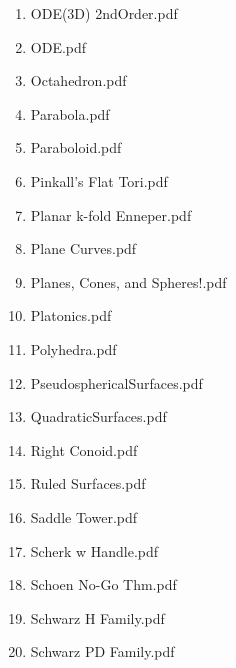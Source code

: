 \documentclass[11pt]{article}
\begin{document}
\begin{enumerate}
\begin{enumerate}
\item ODE(3D) 2ndOrder.pdf
\label{sec-1-1-1-1-29-20-93}

\item ODE.pdf
\label{sec-1-1-1-1-29-20-94}

\item Octahedron.pdf
\label{sec-1-1-1-1-29-20-95}

\item Parabola.pdf
\label{sec-1-1-1-1-29-20-96}

\item Paraboloid.pdf
\label{sec-1-1-1-1-29-20-97}

\item Pinkall's Flat Tori.pdf
\label{sec-1-1-1-1-29-20-98}

\item Planar k-fold Enneper.pdf
\label{sec-1-1-1-1-29-20-99}

\item Plane Curves.pdf
\label{sec-1-1-1-1-29-20-100}

\item Planes, Cones, and Spheres!.pdf
\label{sec-1-1-1-1-29-20-101}

\item Platonics.pdf
\label{sec-1-1-1-1-29-20-102}

\item Polyhedra.pdf
\label{sec-1-1-1-1-29-20-103}

\item PseudosphericalSurfaces.pdf
\label{sec-1-1-1-1-29-20-104}

\item QuadraticSurfaces.pdf
\label{sec-1-1-1-1-29-20-105}

\item Right Conoid.pdf
\label{sec-1-1-1-1-29-20-106}

\item Ruled Surfaces.pdf
\label{sec-1-1-1-1-29-20-107}

\item Saddle Tower.pdf
\label{sec-1-1-1-1-29-20-108}

\item Scherk w Handle.pdf
\label{sec-1-1-1-1-29-20-109}

\item Schoen No-Go Thm.pdf
\label{sec-1-1-1-1-29-20-110}

\item Schwarz H Family.pdf
\label{sec-1-1-1-1-29-20-111}

\item Schwarz PD Family.pdf
\label{sec-1-1-1-1-29-20-112}


\end{enumerate}
\end{enumerate}
\end{document}
